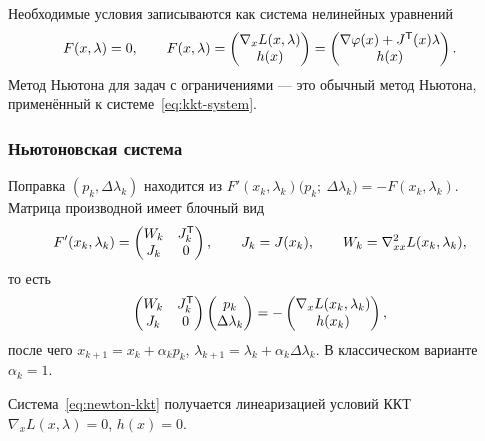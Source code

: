 Необходимые условия записываются как система нелинейных уравнений
\begin{equation}\label{eq:kkt-system}
  F(x,\lambda) = 0 ,
  \qquad
  F(x,\lambda) =
  \begin{pmatrix}
    \nabla_x L(x,\lambda) \\ h(x)
  \end{pmatrix}
  =
  \begin{pmatrix}
    \nabla\varphi(x) + J^{\mathsf{T}}(x)\lambda \\ h(x)
  \end{pmatrix} .
\end{equation}
Метод Ньютона для задач с ограничениями — это обычный метод Ньютона,
применённый к системе~\eqref{eq:kkt-system}.

\subsubsection*{Ньютоновская система}

Поправка $(p_k, \Delta\lambda_k)$ находится из $F'(x_k,\lambda_k)
\big(p_k;\ \Delta\lambda_k\big) = -F(x_k, \lambda_k)$. Матрица производной
имеет блочный вид
\[
  F'(x_k,\lambda_k) =
  \begin{pmatrix} W_k & J_k^{\mathsf{T}} \\ J_k & 0 \end{pmatrix} ,
  \qquad
  J_k = J(x_k) , \qquad W_k = \nabla^2_{xx} L(x_k, \lambda_k) ,
\]
то есть
\begin{equation}\label{eq:newton-kkt}
  \begin{pmatrix} W_k & J_k^{\mathsf{T}} \\ J_k & 0 \end{pmatrix}
  \begin{pmatrix} p_k \\ \Delta\lambda_k \end{pmatrix}
  = -\begin{pmatrix} \nabla_x L(x_k,\lambda_k) \\ h(x_k) \end{pmatrix} ,
\end{equation}
после чего $x_{k+1} = x_k + \alpha_k p_k$,
$\lambda_{k+1} = \lambda_k + \alpha_k \Delta\lambda_k$. В классическом варианте
$\alpha_k = 1$.

\begin{theorem}\label{thm:newton-kkt-lin}
Система~\eqref{eq:newton-kkt} получается линеаризацией условий ККТ
$\nabla_x L(x,\lambda) = 0$, $h(x) = 0$.
\end{theorem}

